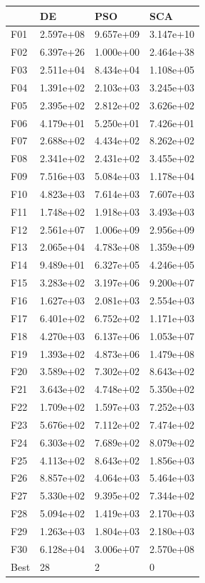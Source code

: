\begin{tabular}{llll}
\toprule
{} &         DE &        PSO &        SCA \\
\midrule
F01  &  2.597e+08 &  9.657e+09 &  3.147e+10 \\
F02  &  6.397e+26 &  1.000e+00 &  2.464e+38 \\
F03  &  2.511e+04 &  8.434e+04 &  1.108e+05 \\
F04  &  1.391e+02 &  2.103e+03 &  3.245e+03 \\
F05  &  2.395e+02 &  2.812e+02 &  3.626e+02 \\
F06  &  4.179e+01 &  5.250e+01 &  7.426e+01 \\
F07  &  2.688e+02 &  4.434e+02 &  8.262e+02 \\
F08  &  2.341e+02 &  2.431e+02 &  3.455e+02 \\
F09  &  7.516e+03 &  5.084e+03 &  1.178e+04 \\
F10  &  4.823e+03 &  7.614e+03 &  7.607e+03 \\
F11  &  1.748e+02 &  1.918e+03 &  3.493e+03 \\
F12  &  2.561e+07 &  1.006e+09 &  2.956e+09 \\
F13  &  2.065e+04 &  4.783e+08 &  1.359e+09 \\
F14  &  9.489e+01 &  6.327e+05 &  4.246e+05 \\
F15  &  3.283e+02 &  3.197e+06 &  9.200e+07 \\
F16  &  1.627e+03 &  2.081e+03 &  2.554e+03 \\
F17  &  6.401e+02 &  6.752e+02 &  1.171e+03 \\
F18  &  4.270e+03 &  6.137e+06 &  1.053e+07 \\
F19  &  1.393e+02 &  4.873e+06 &  1.479e+08 \\
F20  &  3.589e+02 &  7.302e+02 &  8.643e+02 \\
F21  &  3.643e+02 &  4.748e+02 &  5.350e+02 \\
F22  &  1.709e+02 &  1.597e+03 &  7.252e+03 \\
F23  &  5.676e+02 &  7.112e+02 &  7.474e+02 \\
F24  &  6.303e+02 &  7.689e+02 &  8.079e+02 \\
F25  &  4.113e+02 &  8.643e+02 &  1.856e+03 \\
F26  &  8.857e+02 &  4.064e+03 &  5.464e+03 \\
F27  &  5.330e+02 &  9.395e+02 &  7.344e+02 \\
F28  &  5.094e+02 &  1.419e+03 &  2.170e+03 \\
F29  &  1.263e+03 &  1.804e+03 &  2.180e+03 \\
F30  &  6.128e+04 &  3.006e+07 &  2.570e+08 \\
Best &         28 &          2 &          0 \\
\bottomrule
\end{tabular}
